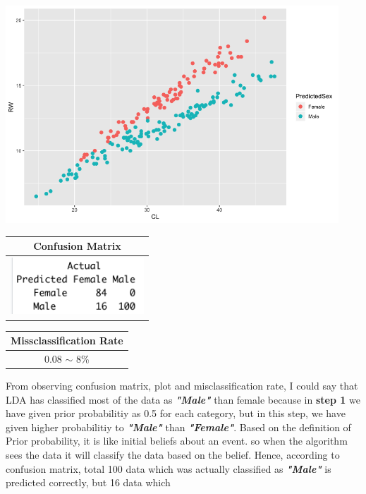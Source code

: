 \documentclass[a4paper,10pt]{article}
\begin{document}
\begin{center}
  \includegraphics[width=125mm,scale=0.10]{CL_RW_Lda_Plot_Priors.png} 
  \begin{tabular}{|c|}
    \hline
    \textbf{Confusion Matrix} \\
    \hline
    \includegraphics[width=50mm,scale=0.10]{CL_RW_LDA_Confusion_Matrix_Prior.png} \\
    \hline
  \end{tabular} \par
  \begin{tabular}{|c|}
    \hline
    \textbf{Missclassification Rate} \\
    \hline
    0.08 $\sim$ 8\% \\
    \hline
  \end{tabular}
\end{center} \par
From observing confusion matrix, plot and misclassification rate, I could say that LDA has classified most of the data as
\textbf{\textit{"Male"}} than female because in \textbf{step 1} we have given prior probabilitiy as 0.5 for each
category, but in this step, we have given higher probabilitiy to \textbf{\textit{"Male"}} than \textbf{\textit{"Female"}}. 
Based on the definition of Prior probability, it is like initial beliefs about an event. 
so when the algorithm sees the data it will classify the data based on the belief. Hence, according to confusion matrix,
total 100 data which was actually classified as \textbf{\textit{"Male"}} is predicted correctly, but 16 data which
\end{document}
